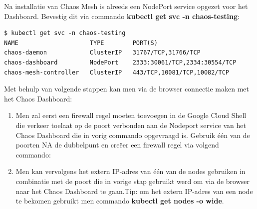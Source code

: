 Na installatie van Chaos Mesh is alreeds een NodePort service opgezet voor het Dashboard. Bevestig dit via commando {\bf kubectl get svc -n chaos-testing}: 
\begin{lstlisting}
$ kubectl get svc -n chaos-testing
NAME                    TYPE        PORT(S)                                
chaos-daemon            ClusterIP   31767/TCP,31766/TCP                     
chaos-dashboard         NodePort    2333:30061/TCP,2334:30554/TCP          
chaos-mesh-controller   ClusterIP   443/TCP,10081/TCP,10082/TCP
\end{lstlisting}

Met behulp van volgende stappen kan men via de browser connectie maken met het Chaos Dashboard:
\begin{enumerate}
    \item Men zal eerst een firewall regel moeten toevoegen in de Google Cloud Shell die verkeer toelaat op de poort verbonden aan de Nodeport service van het Chaos Dashboard die in vorig commando opgevraagd is. Gebruik één van de poorten NA de dubbelpunt en creëer een firewall regel via volgend commando:
    \item Men kan vervolgens het extern IP-adres van één van de nodes gebruiken in combinatie met de poort die in vorige stap gebruikt werd om via de browser naar het Chaos Dashboard te gaan.\newline Tip: om het extern IP-adres van een node te bekomen gebruikt men commando {\bf kubectl get nodes -o wide}.
\end{enumerate}

